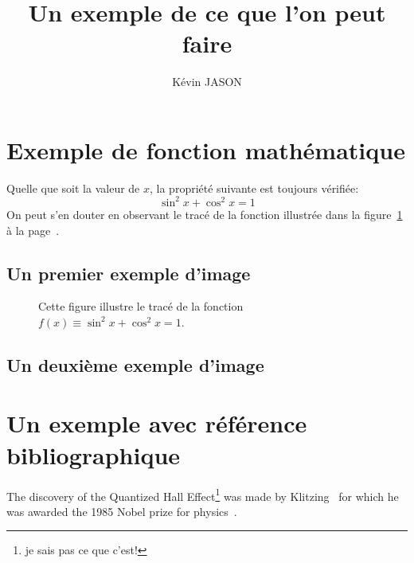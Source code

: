 \documentclass{article}           %
\title{Un exemple de ce que l'on peut faire}     %
\author{Kévin JASON}        %
\begin{document}

\maketitle                        %
\newpage
\tableofcontents                  %
\newpage
\section{Exemple de fonction mathématique}            %
Quelle que soit la valeur de $x$, 
la propriété suivante est toujours 
vérifiée: $$\sin^2 x+\cos^2 x=1$$ 
On peut s'en douter en observant 
le tracé de la fonction illustrée 
dans la figure~\ref{courbe} 
à la page~\pageref{courbe}.
\newpage
\subsection{Un premier exemple d'image}
\begin{figure}[htbp]
\centering
\caption{Cette figure illustre 
le tracé de la fonction 
$f(x)\equiv\sin^2 x+\cos^2 x=1$.}
\label{courbe}
\end{figure}
\newpage
\subsection{Un deuxième exemple d'image}
\begin{figure}[htbp]
\centering
{}
\end{figure}

\section{Un exemple avec référence bibliographique}
The discovery of the Quantized Hall Effect\footnote{je sais pas ce que c'est!} was made by
Klitzing~\cite{qhe} for which he was awarded the 1985 Nobel
prize for physics~\cite{nobel}.
\end{document}
